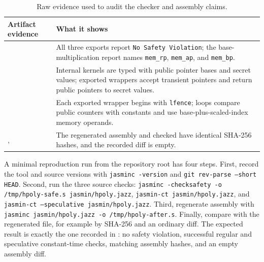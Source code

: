 \documentclass[10pt,twocolumn]{article}
\newcommand{\ct}{constant-time}
\begin{document}
\begin{table}[t]
\centering
\scriptsize
\setlength{\tabcolsep}{3pt}
\begin{tabular}{P{0.35\columnwidth}P{0.55\columnwidth}}
\toprule
Artifact evidence & What it shows \\
\midrule
{} &
All three exports report \texttt{No Safety Violation}; the base-multiplication
report names \texttt{mem\_rp}, \texttt{mem\_ap}, and \texttt{mem\_bp}. \\
 &
Internal kernels are typed with public pointer bases and secret values; exported
wrappers accept transient pointers and return public pointers to secret values. \\
 &
Each exported wrapper begins with \texttt{lfence}; loops compare public
counters with constants and use base-plus-scaled-index memory operands. \\
,  &
The regenerated assembly and checked  have identical SHA-256
hashes, and the recorded diff is empty. \\
\bottomrule
\end{tabular}
\caption{Raw evidence used to audit the checker and assembly claims.}
\label{tab:raw-evidence}
\end{table}

A minimal reproduction run from the repository root has four steps.  First,
record the tool and source versions with \texttt{jasminc -version} and
\texttt{git rev-parse --short HEAD}.  Second, run the three source checks:
\texttt{jasminc -checksafety -o /tmp/hpoly-safe.s jasmin/hpoly.jazz},
\texttt{jasmin-ct jasmin/hpoly.jazz}, and
\texttt{jasmin-ct --speculative jasmin/hpoly.jazz}.  Third, regenerate assembly
with \texttt{jasminc jasmin/hpoly.jazz -o /tmp/hpoly-after.s}.  Finally, compare
 with the regenerated file, for example by SHA-256 and an ordinary
diff.  The expected result is exactly the one recorded in : no
safety violation, successful regular and speculative \ct{} checks, matching
assembly hashes, and an empty assembly diff.
\end{document}
